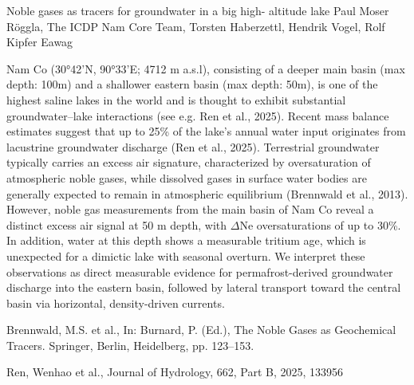 \begin{conf-abstract}
{Noble gases as tracers for groundwater in a big high- altitude lake}
{Paul Moser Röggla, The ICDP Nam Core Team, Torsten Haberzettl, Hendrik Vogel, Rolf Kipfer}
{Eawag}
{Nam Co (30°42'N, 90°33'E; 4712 m a.s.l), consisting of a deeper main basin (max depth: 100m) and a shallower eastern basin (max depth: 50m), is one of the highest saline lakes in the world and is thought to exhibit substantial groundwater–lake interactions (see e.g. Ren et al., 2025). Recent mass balance estimates suggest that up to 25\% of the lake’s annual water input originates from lacustrine groundwater discharge (Ren et al., 2025). Terrestrial groundwater typically carries an excess air signature, characterized by oversaturation of atmospheric noble gases, while dissolved gases in surface water bodies are generally expected to remain in atmospheric equilibrium (Brennwald et al., 2013). However, noble gas measurements from the main basin of Nam Co reveal a distinct excess air signal at 50 m depth, with $\Delta$Ne oversaturations of up to 30\%. In addition, water at this depth shows a measurable tritium age, which is unexpected for a dimictic lake with seasonal overturn. We interpret these observations as direct measurable evidence for permafrost-derived groundwater discharge into the eastern basin, followed by lateral transport toward the central basin via horizontal, density-driven currents.

Brennwald, M.S. et al., In: Burnard, P. (Ed.), The Noble Gases as Geochemical Tracers. Springer, Berlin, Heidelberg, pp. 123–153. %

Ren, Wenhao et al., Journal of Hydrology, 662, Part B, 2025, 133956%
}
\end{conf-abstract}
